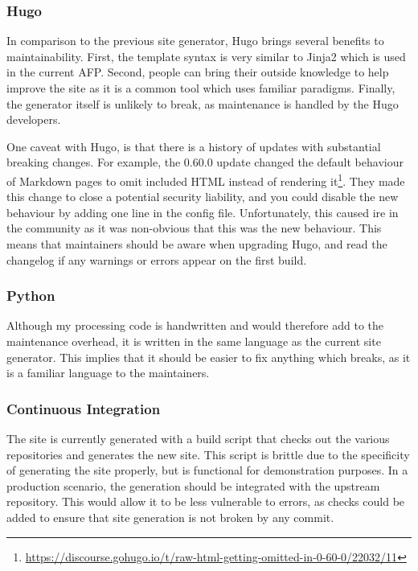 \documentclass[bsc,frontabs,oneside,singlespacing,parskip,deptreport,logo]{infthesis}
\begin{document}
\subsubsection{Hugo}

In comparison to the previous site generator, Hugo brings several benefits to maintainability. First, the template syntax is very similar to Jinja2 which is used in the current AFP\@. Second, people can bring their outside knowledge to help improve the site as it is a common tool which uses familiar paradigms. Finally, the generator itself is unlikely to break, as maintenance is handled by the Hugo developers. 

One caveat with Hugo, is that there is a history of updates with substantial breaking changes. For example, the 0.60.0 update changed the default behaviour of Markdown pages to omit included HTML instead of rendering it\footnote{\url{https://discourse.gohugo.io/t/raw-html-getting-omitted-in-0-60-0/22032/11}}. They made this change to close a potential security liability, and you could disable the new behaviour by adding one line in the config file. Unfortunately, this caused ire in the community as it was non-obvious that this was the new behaviour. \cbstart This means that maintainers should be aware when upgrading Hugo, and read the changelog if any warnings or errors appear on the first build. \cbend

\subsubsection{Python}

Although my processing code is handwritten and would therefore add to the maintenance overhead, it is written in the same language as the current site generator. This implies that it should be easier to fix anything which breaks, as it is a familiar language to the maintainers. 

\subsubsection{Continuous Integration}

The site is currently generated with a build script that checks out the various repositories and generates the new site. This script is brittle due to the specificity of generating the site properly, but is functional for demonstration purposes. \cbstart In a production scenario, the generation should be integrated with the upstream repository. This would allow it to be less vulnerable to errors, as checks could be added to ensure that site generation is not broken by any commit. \cbend
\end{document}
